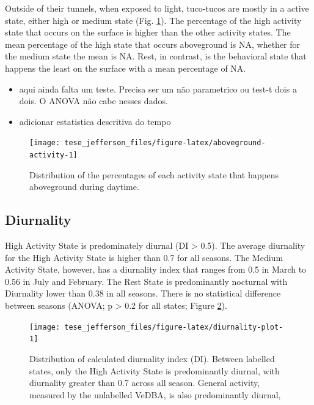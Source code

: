 \documentclass[english,msc,numbers,hidelinks]{coppe}
\providecommand{\tightlist}{%
  \setlength{\itemsep}{0pt}\setlength{\parskip}{0pt}}
\begin{document}
  Outside of their tunnels, when exposed to light, tuco-tucos are mostly in a active state, either high or medium state (Fig. \ref{fig:aboveground-activity}). The percentage of the high activity state that occurs on the surface is higher than the other activity states. The mean percentage of the high state that occurs aboveground is NA, whether for the medium state the mean is NA. Rest, in contrast, is the behavioral state that happens the least on the surface with a mean percentage of NA.\newline
  \begin{itemize}
  \tightlist
  \item
    aqui ainda falta um teste. Precisa ser um não parametrico ou test-t dois a dois. O ANOVA não cabe nesses dados.
  \item
    adicionar estatistica descritiva do tempo
  \end{itemize}
  \begin{figure}[H]

  {\centering \texttt{[image: tese\_jefferson\_files/figure-latex/aboveground-activity-1]} 

  }

  \caption{Distribution of the percentages of each activity state that happens aboveground during daytime.}\label{fig:aboveground-activity}
  \end{figure}
  \newpage

  \hypertarget{diurnality}{%
  \subsection{Diurnality}\label{diurnality}}

  High Activity State is predominately diurnal (DI \textgreater{} 0.5). The average diurnality for the High Activity State is higher than 0.7 for all seasons. The Medium Activity State, however, has a diurnality index that ranges from 0.5 in March to 0.56 in July and February. The Rest State is predominantly nocturnal with Diurnality lower than 0.38 in all seasons. There is no statistical difference between seasons (ANOVA; p \textgreater{} 0.2 for all states; Figure \ref{fig:diurnality-plot}). \newline
  \begin{figure}[H]

  {\centering \texttt{[image: tese\_jefferson\_files/figure-latex/diurnality-plot-1]} 

  }

  \caption{Distribution of calculated diurnality index (DI). Between labelled states, only the High Activity State is predominantly diurnal, with diurnality greater than 0.7 across all season. General activity, measured by the unlabelled VeDBA, is also predominantly diurnal, }\label{fig:diurnality-plot}
  \end{figure}
  \newpage
\end{document}
